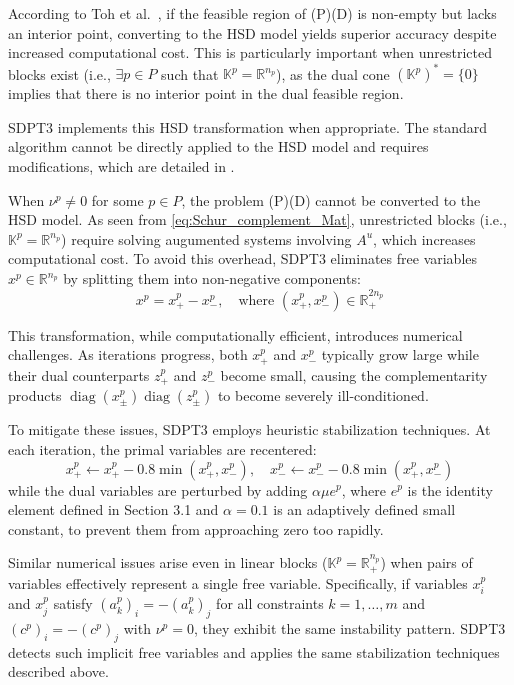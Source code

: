 According to Toh et al.~\cite{toh1999}, if the feasible region of (P)(D) is non-empty but lacks an interior point, converting to the HSD model yields superior accuracy despite increased computational cost.
This is particularly important when unrestricted blocks exist (i.e., $\exists p\in P$ such that $\mathbb{K}^p=\mathbb{R}^{n_p}$), as the dual cone $(\mathbb{K}^p)^*=\{0\}$ implies that there is no interior point in the dual feasible region.

SDPT3 implements this HSD transformation when appropriate.
The standard algorithm cannot be directly applied to the HSD model and requires modifications, which are detailed in \cite{toh1999}.

\medskip

When $\nu^p \neq 0$ for some $p \in P$, the problem (P)(D) cannot be converted to the HSD model.
As seen from \eqref{eq:Schur_complement_Mat}, unrestricted blocks (i.e., $\mathbb{K}^p = \mathbb{R}^{n_p}$) require solving augumented systems involving $A^u$, which increases computational cost.
To avoid this overhead, SDPT3 eliminates free variables $x^p \in \mathbb{R}^{n_p}$ by splitting them into non-negative components:
\[
   x^p = x^p_+ - x^p_-, \quad \text{where } (x^p_+, x^p_-) \in \mathbb{R}^{2n_p}_+
\]

This transformation, while computationally efficient, introduces numerical challenges.
As iterations progress, both $x^p_+$ and $x^p_-$ typically grow large while their dual counterparts $z^p_+$ and $z^p_-$ become small, causing the complementarity products $\operatorname{diag}(x^p_\pm) \operatorname{diag}(z^p_\pm)$ to become severely ill-conditioned.

To mitigate these issues, SDPT3 employs heuristic stabilization techniques.
At each iteration, the primal variables are recentered:
\[
   x^p_+ \leftarrow x^p_+ - 0.8 \min(x^p_+, x^p_-), \quad
   x^p_- \leftarrow x^p_- - 0.8 \min(x^p_+, x^p_-)
\]
while the dual variables are perturbed by adding $\alpha \mu e^p$, where $e^p$ is the identity element defined in Section 3.1 and $\alpha = 0.1$ is an adaptively defined small constant, to prevent them from approaching zero too rapidly.

\medskip

Similar numerical issues arise even in linear blocks ($\mathbb{K}^p=\mathbb{R}^{n_p}_+$) when pairs of variables effectively represent a single free variable.
Specifically, if variables $x^p_i$ and $x^p_j$ satisfy $(a^p_k)_i = -(a^p_k)_j$ for all constraints $k=1,\ldots,m$ and $(c^p)_i = -(c^p)_j$ with $\nu^p = 0$, they exhibit the same instability pattern.
SDPT3 detects such implicit free variables and applies the same stabilization techniques described above.



